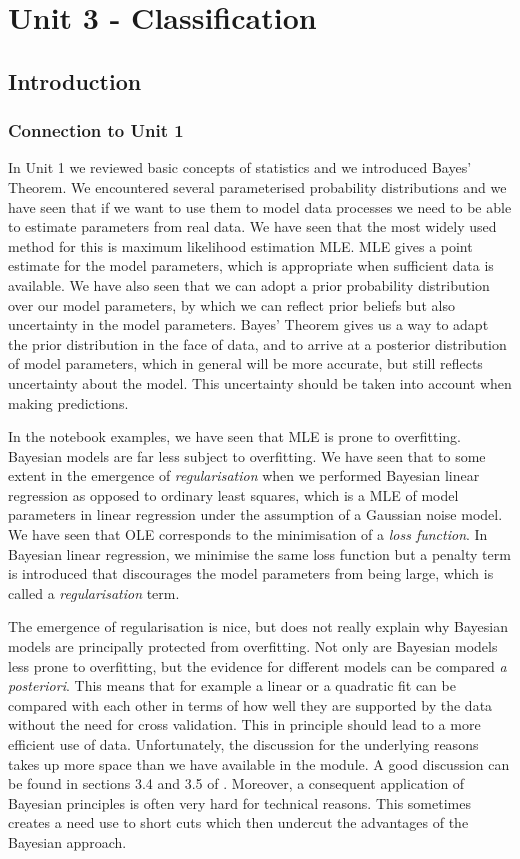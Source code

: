 \part{Unit 3 - Classification}
\chapter{Introduction}

\section{Connection to Unit 1}
In Unit 1 we reviewed basic concepts of statistics and we introduced
Bayes' Theorem. We  encountered several parameterised probability distributions
and we have seen that if we want to use them to model data processes we
need to be able to estimate parameters from real data. We have seen
that the most widely used method for this is maximum likelihood estimation
MLE. MLE gives a point estimate for the model parameters, which is appropriate
when sufficient data is available. We have also seen that we can adopt a prior
probability distribution over our model parameters, by which we can reflect prior beliefs but also uncertainty
in the model parameters. Bayes' Theorem gives us a way to adapt the prior distribution in the face
of data, and to arrive at a posterior distribution of model parameters, which in general will be more
accurate, but still reflects uncertainty about the model. This uncertainty should be taken into account when
making predictions.

In the notebook examples, we have seen that MLE is prone to overfitting. Bayesian models are
far less subject to overfitting. We have seen that to some extent in the emergence of \emph{regularisation}
when we performed Bayesian linear regression as opposed to ordinary least squares, which is a MLE of
model parameters in linear regression under the assumption of a Gaussian noise model. We have seen that OLE corresponds
to the minimisation of a \emph{loss function}. In Bayesian linear regression, we minimise the same loss function
but a penalty term is introduced that discourages the model parameters from  being large, which is called
a \emph{regularisation} term.

The emergence of regularisation is nice, but does not really explain why Bayesian models are
principally protected from overfitting. Not only are Bayesian models less prone to overfitting, but the evidence
for different models can be compared \emph{a posteriori}. This means that for example a linear or a quadratic fit
can be compared with each other in terms of how well they are supported by the data without the need for
cross validation. This in principle should lead to a more efficient
use of data. Unfortunately, the discussion for the underlying reasons takes up
more space than we have available in the module. A good discussion can be found in sections 3.4
and 3.5 of \cite{bishop2006}. Moreover, a consequent application of Bayesian principles is often very
hard for technical reasons. This sometimes creates a need use to short cuts which then undercut the
advantages of the Bayesian approach.

